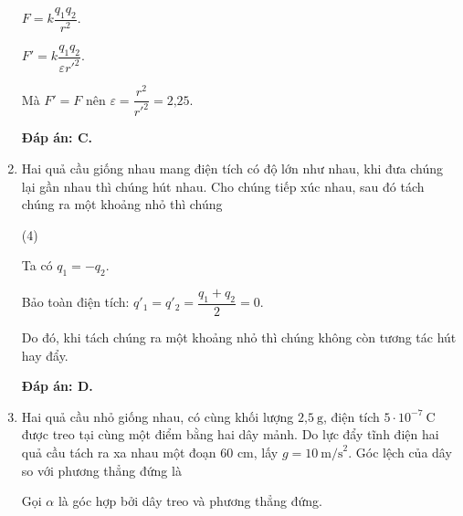 \begin{enumerate}[label=\bfseries Câu \arabic*:]
{	}

	\loigiai
	{$F=k\dfrac{q_1q_2}{r^2}$.
		
		$F'=k\dfrac{q_1q_2}{\varepsilon r'^2}$.
		
		Mà $F'=F$ nên $\varepsilon=\dfrac{r^2}{r'^2}=\text{2,25}$.
		
		\textbf{Đáp án: C.}
	}

\item {}
	
	\cauhoi
	{Hai quả cầu giống nhau mang điện tích có độ lớn như nhau, khi đưa chúng lại gần nhau thì chúng hút nhau. Cho chúng tiếp xúc nhau, sau đó tách chúng ra một khoảng nhỏ thì chúng 
		\begin{mcq}(4)

		\end{mcq}
	}

	\loigiai
	{	Ta có $q_1=-q_2$.
		
		Bảo toàn điện tích: $q'_1=q'_2=\dfrac{q_1+q_2}{2}=0$.
		
		Do đó, khi tách chúng ra một khoảng nhỏ thì chúng không còn tương tác hút hay đẩy.
		
		\textbf{Đáp án: D.}	
	}

\item {}
	
	\cauhoi
	{Hai quả cầu nhỏ giống nhau, có cùng khối lượng $\text{2,5}\ \text{g}$, điện tích $5\cdot 10^{-7}\ \text{C}$ được treo tại cùng một điểm bằng hai dây mảnh. Do lực đẩy tĩnh điện hai quả cầu tách ra xa nhau một đoạn 60 cm, lấy $g=10\ \text{m/s}^2$. Góc lệch của dây so với phương thẳng đứng là
		
	
	}

	\loigiai
	{Gọi $\alpha$ là góc hợp bởi dây treo và phương thẳng đứng.
		
}
\end{enumerate}
